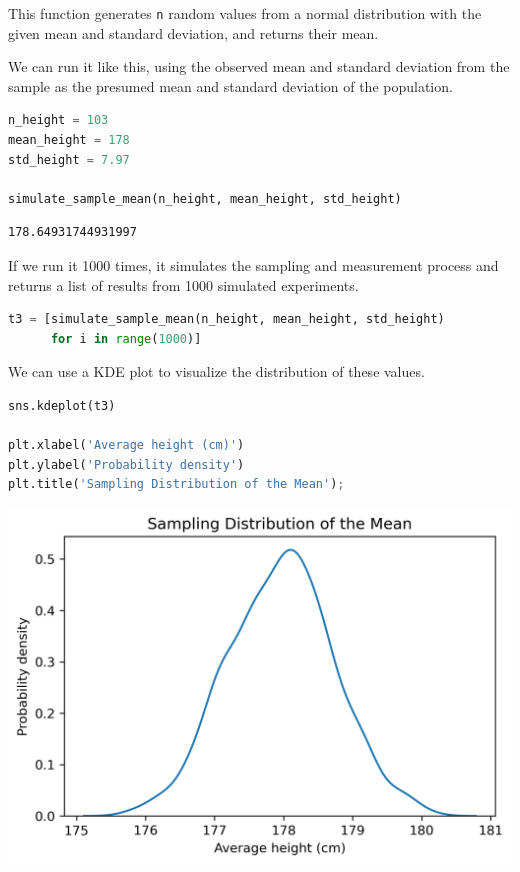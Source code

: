 This function generates \passthrough{\lstinline!n!} random values from a
normal distribution with the given mean and standard deviation, and
returns their mean.

We can run it like this, using the observed mean and standard deviation
from the sample as the presumed mean and standard deviation of the
population.

\begin{lstlisting}[language=Python,style=source]
n_height = 103
mean_height = 178
std_height = 7.97

simulate_sample_mean(n_height, mean_height, std_height)
\end{lstlisting}

\begin{lstlisting}[style=output]
178.64931744931997
\end{lstlisting}

If we run it 1000 times, it simulates the sampling and measurement
process and returns a list of results from 1000 simulated experiments.

\begin{lstlisting}[language=Python,style=source]
t3 = [simulate_sample_mean(n_height, mean_height, std_height)
      for i in range(1000)]
\end{lstlisting}

We can use a KDE plot to visualize the distribution of these values.

\begin{lstlisting}[language=Python,style=source]
sns.kdeplot(t3)

plt.xlabel('Average height (cm)')
plt.ylabel('Probability density')
plt.title('Sampling Distribution of the Mean');
\end{lstlisting}

\begin{center}
\includegraphics[scale=0.75]{11_resampling_files/11_resampling_60_0.png}
\end{center}

